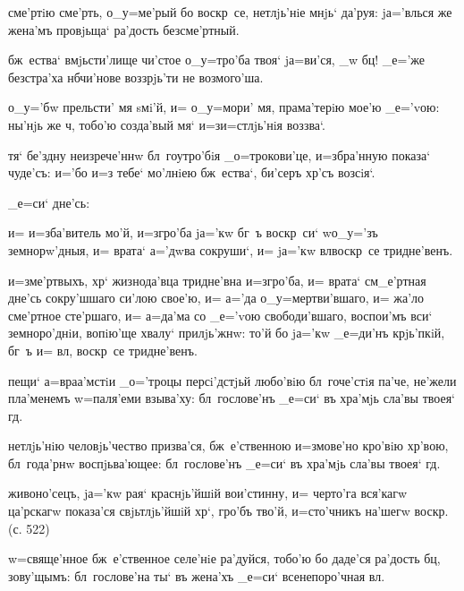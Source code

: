 сме'ртiю сме'рть, о_у=ме'рый бо воскр~се, 
нетлjь'нiе мнjь` да'руя: jа='влься же жена'мъ провjьща` 
ра'дость безсме'ртный.

  бж~ества` 
вмjьсти'лище чи'стое о_у=тро'ба твоя` jа=ви'ся, _w бц! 
_е='же без\ъ стра'ха нб чи'нове воззрjь'ти не 
возмого'ша.


 о_у='бw прельсти' мя sмi'й, и= о_у=мори' 
мя, прама'терiю мое'ю _е='vою: ны'нjь же ч, тобо'ю 
созда'вый мя` и=з\ъ и=стлjь'нiя воззва`.

 тя` бе'здну неизрече'ннw бл~гоутро'бiя 
_о=трокови'це, и=збра'нную показа` чуде'съ: и='бо и=з\ъ 
тебе` мо'лнiею бж~ества`, би'серъ хр'съ возсiя`.

     _е=си` 
дне'сь:

 и= и=зба'витель мо'й, и=з\ъ гро'ба jа='кw 
бг~ъ воскр~си` w\т о_у='зъ земнорw'дныя, и= врата` 
а='дwва сокруши`, и= jа='кw вл воскр~се тридне'венъ.

  и=з\ъ ме'ртвыхъ, хр` 
жизнода'вца тридне'вна и=з\ъ гро'ба, и= врата` см_е'ртная 
дне'сь сокру'шшаго си'лою свое'ю, и= а='да 
о_у=мертви'вшаго, и= жа'ло сме'ртное сте'ршаго, и= 
а=да'ма со _е='vою свободи'вшаго, воспои'мъ вси` 
земноро'днiи, вопiю'ще хвалу` прилjь'жнw: то'й бо jа='кw 
_е=ди'нъ крjь'пкiй, бг~ъ и= вл, воскр~се тридне'венъ.


 пещи` а=враа'мстiи _о='троцы 
персi'дстjьй любо'вiю бл~гоче'стiя па'че, не'жели 
пла'менемъ w=паля'еми взыва'ху: бл~гослове'нъ _е=си` въ 
хра'мjь сла'вы твоея` гд.

 нетлjь'нiю человjь'чество призва'ся, 
бж~е'ственною и=змове'но кро'вiю хр'вою, бл~года'рнw 
воспjьва'ющее: бл~гослове'нъ _е=си` въ хра'мjь сла'вы 
твоея` гд.

 живоно'сецъ, jа='кw рая` краснjь'йшiй 
вои'стинну, и= черто'га вся'кагw ца'рскагw показа'ся 
свjьтлjь'йшiй хр`, гро'бъ тво'й, и=сто'чникъ на'шегw 
воскр. (с. 522)

  w=свяще'нное бж~е'ственное 
селе'нiе ра'дуйся, тобо'ю бо даде'ся ра'дость бц, 
зову'щымъ: бл~гослове'на ты` въ жена'хъ _е=си` 
всенепоро'чная вл.

